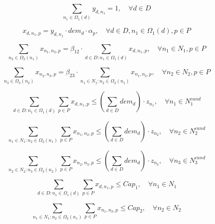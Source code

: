 

\begin{equation}
\sum_{n_1 \in \Omega_1(d)} y_{d,n_1} = 1, \quad \forall d \in D \tag{1}
\end{equation}

\begin{equation}
x_{d,n_1,p} = y_{d,n_1} \cdot dem_d \cdot \alpha_p, \quad \forall d \in D, n_1 \in \Omega_1(d), p \in P \tag{2}
\end{equation}

\begin{equation}
\sum_{n_2 \in \Omega_2(n_1)} x_{n_1,n_2,p} = \beta_{12} \cdot \sum_{d \in D: n_1 \in \Omega_1(d)} x_{d,n_1,p}, \quad \forall n_1 \in N_1, p \in P \tag{3}
\end{equation}

\begin{equation}
\sum_{n_3 \in \Omega_3(n_2)} x_{n_2,n_3,p} = \beta_{23} \cdot \sum_{n_1 \in N_1: n_2 \in \Omega_2(n_1)} x_{n_1,n_2,p}, \quad \forall n_2 \in N_2, p \in P \tag{4}
\end{equation}

\begin{equation}
\sum_{d \in D: n_1 \in \Omega_1(d)} \sum_{p \in P} x_{d,n_1,p} \leq \left(\sum_{d \in D} dem_d\right) \cdot z_{n_1}, \quad \forall n_1 \in N_1^{cand} \tag{5}
\end{equation}

\begin{equation}
\sum_{n_1 \in N_1: n_2 \in \Omega_2(n_1)} \sum_{p \in P} x_{n_1,n_2,p} \leq \left(\sum_{d \in D} dem_d\right) \cdot z_{n_2}, \quad \forall n_2 \in N_2^{cand} \tag{6}
\end{equation}

\begin{equation}
\sum_{n_2 \in N_2: n_3 \in \Omega_3(n_2)} \sum_{p \in P} x_{n_2,n_3,p} \leq \left(\sum_{d \in D} dem_d\right) \cdot z_{n_3}, \quad \forall n_3 \in N_3^{cand} \tag{7}
\end{equation}

\begin{equation}
\sum_{d \in D: n_1 \in \Omega_1(d)} \sum_{p \in P} x_{d,n_1,p} \leq Cap_1, \quad \forall n_1 \in N_1 \tag{8}
\end{equation}

\begin{equation}
\sum_{n_1 \in N_1: n_2 \in \Omega_2(n_1)} \sum_{p \in P} x_{n_1,n_2,p} \leq Cap_2, \quad \forall n_2 \in N_2 \tag{9}
\end{equation}

